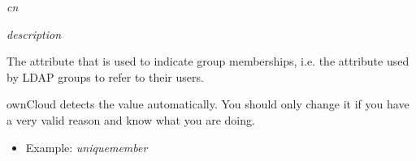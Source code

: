 \documentclass[letterpaper,10pt,english]{sphinxmanual}
\begin{document}
\begin{description}
\begin{itemize}
\begin{DUlineblock}{0em}
\item[] \emph{cn}
\item[] \emph{description}
\end{DUlineblock}

\end{itemize}

\item[{Group Member association:}] \leavevmode
The attribute that is used to indicate group memberships, i.e. the attribute
used by LDAP groups to refer to their users.

ownCloud detects the value automatically. You should only change it if you
have a very valid reason and know what you are doing.
\begin{itemize}
\item {} 
Example: \emph{uniquemember}

\end{itemize}

\end{description}
\end{document}
